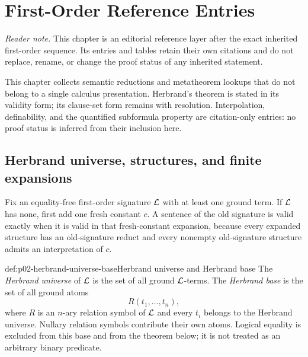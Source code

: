 
\chapter{First-Order Reference Entries}
\label{sec:p02-first-order-depth}

\noindent\textit{Reader note.}  This chapter is an editorial reference layer
after the exact inherited first-order sequence.  Its entries and tables retain
their own citations and do not replace, rename, or change the proof status of
any inherited statement.

This chapter collects semantic reductions and metatheorem lookups that do not
belong to a single calculus presentation.  Herbrand's theorem is stated in its
validity form; its clause-set form remains with resolution.  Interpolation,
definability, and the quantified subformula property are citation-only entries:
no proof status is inferred from their inclusion here.

\section{Herbrand universe, structures, and finite expansions}
\label{sec:p02-herbrand-validity}

Fix an equality-free first-order signature \(\mathcal{L}\) with at least one ground
term.  If \(\mathcal{L}\) has none, first add one fresh constant \(c\).  A sentence
of the old signature is valid exactly when it is valid in that fresh-constant
expansion, because every expanded structure has an old-signature reduct and
every nonempty old-signature structure admits an interpretation of \(c\).

\begin{hbdefinition}{def:p02-herbrand-universe-base}{Herbrand universe and Herbrand base}
The \emph{Herbrand universe} of \(\mathcal{L}\) is the set of all ground
\(\mathcal{L}\)-terms.  The \emph{Herbrand base} is the set of all ground atoms
\[
  R(t_1,\ldots,t_n),
\]
where \(R\) is an \(n\)-ary relation symbol of \(\mathcal{L}\) and every \(t_i\)
belongs to the Herbrand universe.  Nullary relation symbols contribute their
own atoms.  Logical equality is excluded from this base and from the theorem
below; it is not treated as an arbitrary binary predicate.
\end{hbdefinition}

